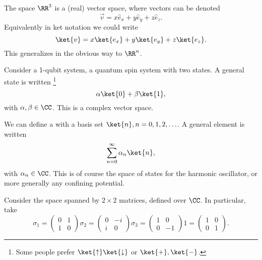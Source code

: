 \begin{exm}
    The space $\RR^3$ is a (real) vector space, where vectors can be denoted
    \begin{equation}
        \vec{v}= x \hat e_x + y \hat e_y + z \hat e_z.
    \end{equation}
    Equivalently in ket notation we could write
    \begin{equation}
        \ket{v}= x \ket{e_x} + y \ket{e_y} + z \ket{e_z}.
    \end{equation}
    This generalizes in the obvious way to $\RR^n$.
\end{exm}
\begin{exm}
    Consider a 1-qubit system, a quantum spin system with two states. A general state is written%
        \footnote{Some people prefer $\ket{\uparrow}\ket{\downarrow}$ or $\ket{+},\ket{-}$.}
    \begin{equation}
        \alpha\ket{0} +\beta\ket{1},
    \end{equation}
    with $\alpha,\beta\in \CC$.
    This is a complex vector space.
\end{exm}
\begin{exm}
    We can define a  with a basis set $\ket{n},n=0,1,2,\ldots$. A general element is written
    \begin{equation}
        \sum_{n=0}^\infty \alpha_n \ket{n},
    \end{equation}
    with $\alpha_n\in \CC$. This is of course the space of states for the harmonic oscillator, or more generally any confining potential.
\end{exm}
\begin{exm}
    Consider the space spanned by $2\times 2$ matrices, defined over $\CC$. In particular, take
    \begin{equation}
        \sigma_1 =\begin{pmatrix}
            0 & 1\\
            1 & 0
        \end{pmatrix}
        \sigma_2= \begin{pmatrix}
            0 & -i\\
            i & 0
        \end{pmatrix}
        \sigma_3= \begin{pmatrix}
            1 & 0\\
            0 & -1
        \end{pmatrix}
        1=\begin{pmatrix}
            1 & 0\\
            0 & 1
        \end{pmatrix}.
    \end{equation}
\end{exm}
